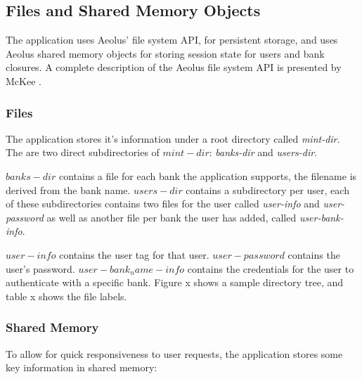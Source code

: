\subsection{Files and Shared Memory Objects}

The application uses Aeolus' file system API, for persistent storage, and uses Aeolus shared memory objects for storing session state for users and bank closures. A complete description of the Aeolus file system API is presented by McKee \cite{mckee}.

\subsubsection{Files}\label{fs}

The application stores it's information under a root directory called \emph{mint-dir}. The are two direct subdirectories of $mint-dir$: \emph{banks-dir} and \emph{users-dir}.

$banks-dir$ contains a file for each bank the application supports, the filename is derived from the bank name. $users-dir$ contains a subdirectory per user, each of these subdirectories contains two files for the user called \emph{user-info} and \emph{user-password} as well as another file per bank the user has added, called \emph{user-bank-info}.

$user-info$ contains the user tag for that user. $user-password$ contains the user's password. $user-bank_name-info$ contains the credentials for the user to authenticate with a specific bank. Figure x shows a sample directory tree, and table x shows the file labels.

\subsubsection{Shared Memory}

To allow for quick responsiveness to user requests, the application stores some key information in shared memory:

